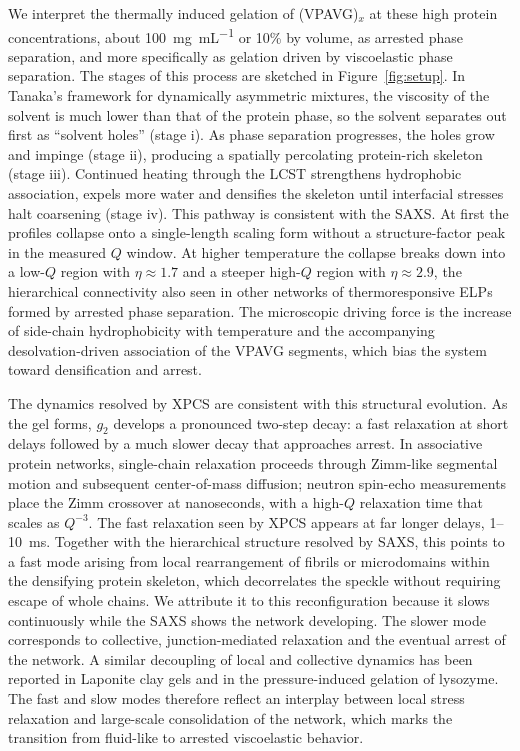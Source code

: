 \documentclass[journal=nalefd,manuscript=letter,layout=traditional]{achemso}
\newcommand{\VP}[1]{(VPAVG)$_{#1}$}
\begin{document}
We interpret the thermally induced gelation of \VP{x} at these high protein concentrations, about \SI{100}{\milli\gram\per\milli\liter} or 10\% by volume, as arrested phase separation,\cite{Glassman2015-cw} and more specifically as gelation driven by viscoelastic phase separation.\cite{Tanaka2000-qq} The stages of this process are sketched in Figure~\ref{fig:setup}. In Tanaka's framework for dynamically asymmetric mixtures, the viscosity of the solvent is much lower than that of the protein phase, so the solvent separates out first as ``solvent holes'' (stage i). As phase separation progresses, the holes grow and impinge (stage ii), producing a spatially percolating protein-rich skeleton (stage iii). Continued heating through the LCST strengthens hydrophobic association, expels more water and densifies the skeleton until interfacial stresses halt coarsening (stage iv).\cite{Tanaka2006-tz} This pathway is consistent with the SAXS. At first the profiles collapse onto a single-length scaling form without a structure-factor peak in the measured $Q$ window. At higher temperature the collapse breaks down into a low-$Q$ region with $\eta\approx1.7$ and a steeper high-$Q$ region with $\eta\approx2.9$, the hierarchical connectivity also seen in other networks of thermoresponsive ELPs formed by arrested phase separation.\cite{Urosev2020-mi} The microscopic driving force is the increase of side-chain hydrophobicity with temperature\cite{Wolfenden2015-as} and the accompanying desolvation-driven association of the VPAVG segments,\cite{Glassman2015-cw} which bias the system toward densification and arrest.

The dynamics resolved by XPCS are consistent with this structural evolution. As the gel forms, $g_2$ develops a pronounced two-step decay: a fast relaxation at short delays followed by a much slower decay that approaches arrest. In associative protein networks, single-chain relaxation proceeds through Zimm-like segmental motion and subsequent center-of-mass diffusion; neutron spin-echo measurements place the Zimm crossover at nanoseconds, with a high-$Q$ relaxation time that scales as $Q^{-3}$.\cite{Rao2020-qr} The fast relaxation seen by XPCS appears at far longer delays, 1--\SI{10}{\milli\second}. Together with the hierarchical structure resolved by SAXS, this points to a fast mode arising from local rearrangement of fibrils or microdomains within the densifying protein skeleton, which decorrelates the speckle without requiring escape of whole chains. We attribute it to this reconfiguration because it slows continuously while the SAXS shows the network developing. The slower mode corresponds to collective, junction-mediated relaxation and the eventual arrest of the network. A similar decoupling of local and collective dynamics has been reported in Laponite clay gels\cite{Chen2020-fn} and in the pressure-induced gelation of lysozyme.\cite{Moron2022-nn} The fast and slow modes therefore reflect an interplay between local stress relaxation and large-scale consolidation of the network, which marks the transition from fluid-like to arrested viscoelastic behavior.
\end{document}
